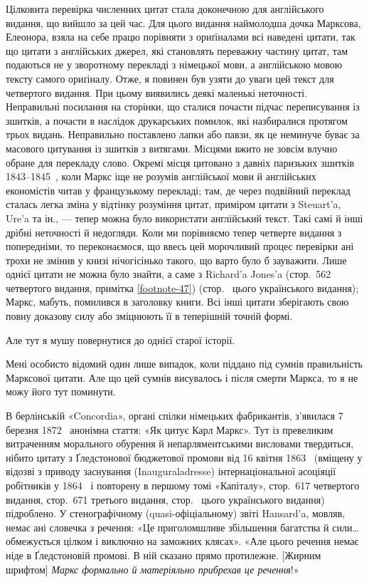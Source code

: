 Цілковита перевірка численних цитат стала доконечною для
англійського видання, що вийшло за цей час. Для цього видання
наймолодша дочка Марксова, Елеонора, взяла на себе працю
порівняти з ориґіналами всі наведені цитати, так що цитати
з англійських джерел, які становлять переважну частину цитат,
там подаються не у зворотному перекладі з німецької мови, а
англійською мовою тексту самого ориґіналу. Отже, я повинен був
узяти до уваги цей текст для четвертого видання. При цьому виявились
деякі маленькі неточності. Неправильні посилання на сторінки,
що сталися почасти підчас переписування із зшитків, а почасти
в наслідок друкарських помилок, які назбиралися протягом
трьох видань. Неправильно поставлено лапки або павзи, як це
неминуче буває за масового цитування із зшитків з витягами.
Місцями вжито не зовсім влучно обране для перекладу слово.
Окремі місця цитовано з давніх паризьких зшитків 1843--1845~,
коли Маркс іще не розумів англійської мови й англійських економістів
читав у французькому перекладі; там, де через подвійний
переклад сталась легка зміна у відтінку розуміння цитат, приміром
цитати з Steuart’a, Ure’a та ін., — тепер можна було використати
англійський текст. Такі самі й інші дрібні неточності й недогляди.
Коли ми порівняємо тепер четверте видання з попередніми, то
переконаємося, що ввесь цей морочливий процес перевірки ані
трохи не змінив у книзі нічогісінько такого, що варто було б
зауважити. Лише однієї цитати не можна було знайти, а саме
з Richard’a Jones’a (стор.~562 четвертого видання, примітка \ref{footnote-47})
(стор.~\pageref{footnote-47} цього українського видання); Маркс, мабуть, помилився
в заголовку книги. Всі інші цитати зберігають свою повну
доказову силу або зміцнюють її в теперішній точній формі.

Але тут я мушу повернутися до однієї старої історії.

Мені особисто відомий один лише випадок, коли піддано під
сумнів правильність Марксової цитати. Але що цей сумнів висувалось
і після смерти Маркса, то я не можу його тут поминути.

В берлінській «Concordia», органі спілки німецьких фабрикантів,
з’явилася 7 березня 1872~ анонімна стаття: «Як цитує
Карл Маркс». Тут із превеликим витраченням морального обурення
й непарляментськими висловами твердиться, нібито цитату
з Ґледстонової бюджетової промови від 16 квітня 1863~
(вміщену у відозві з приводу заснування (Inauguraladresse) інтернаціональної
асоціяції робітників у 1864~ і повторену в першому
томі «Капіталу», стор.~617 четвертого видання, стор.~671 третього
видання, стор.~\pageref{footnote-105} цього українського видання) підроблено.
У стенографічному (quasi-офіціальному) звіті Hansard’a,
мовляв, немає ані словечка з речення: «Це приголомшливе збільшення
багатства й сили\dots{} обмежується цілком і виключно на
заможних клясах». «Але цього речення немає ніде в Ґледстоновій
промові. В ній сказано прямо протилежне. [Жирним
шрифтом] \emph{Маркс формально й матеріяльно прибрехав це речення}!»

